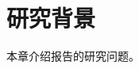 \documentclass{ctexrep}
\begin{document}
\tableofcontents
\chapter{研究背景}
本章介绍报告的研究问题。
\end{document}
